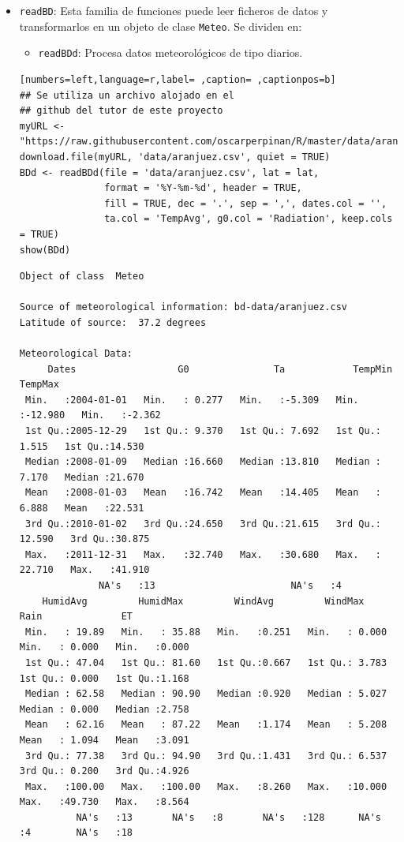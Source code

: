 \begin{itemize}
\item \texttt{readBD}: Esta familia de funciones puede leer ficheros de datos y transformarlos en un objeto de clase \texttt{Meteo}. Se dividen en:
\begin{itemize}
\item \texttt{readBDd}: Procesa datos meteorológicos de tipo diarios.
\end{itemize}
\begin{lstlisting}[numbers=left,language=r,label= ,caption= ,captionpos=b]
## Se utiliza un archivo alojado en el
## github del tutor de este proyecto 
myURL <-"https://raw.githubusercontent.com/oscarperpinan/R/master/data/aranjuez.csv"
download.file(myURL, 'data/aranjuez.csv', quiet = TRUE)
BDd <- readBDd(file = 'data/aranjuez.csv', lat = lat,
               format = '%Y-%m-%d', header = TRUE,
               fill = TRUE, dec = '.', sep = ',', dates.col = '',
               ta.col = 'TempAvg', g0.col = 'Radiation', keep.cols = TRUE)
show(BDd)
\end{lstlisting}

\begin{verbatim}
Object of class  Meteo 

Source of meteorological information: bd-data/aranjuez.csv 
Latitude of source:  37.2 degrees

Meteorological Data:
     Dates                  G0               Ta            TempMin           TempMax      
 Min.   :2004-01-01   Min.   : 0.277   Min.   :-5.309   Min.   :-12.980   Min.   :-2.362  
 1st Qu.:2005-12-29   1st Qu.: 9.370   1st Qu.: 7.692   1st Qu.:  1.515   1st Qu.:14.530  
 Median :2008-01-09   Median :16.660   Median :13.810   Median :  7.170   Median :21.670  
 Mean   :2008-01-03   Mean   :16.742   Mean   :14.405   Mean   :  6.888   Mean   :22.531  
 3rd Qu.:2010-01-02   3rd Qu.:24.650   3rd Qu.:21.615   3rd Qu.: 12.590   3rd Qu.:30.875  
 Max.   :2011-12-31   Max.   :32.740   Max.   :30.680   Max.   : 22.710   Max.   :41.910  
		      NA's   :13                        NA's   :4                         
    HumidAvg         HumidMax         WindAvg         WindMax            Rain              ET       
 Min.   : 19.89   Min.   : 35.88   Min.   :0.251   Min.   : 0.000   Min.   : 0.000   Min.   :0.000  
 1st Qu.: 47.04   1st Qu.: 81.60   1st Qu.:0.667   1st Qu.: 3.783   1st Qu.: 0.000   1st Qu.:1.168  
 Median : 62.58   Median : 90.90   Median :0.920   Median : 5.027   Median : 0.000   Median :2.758  
 Mean   : 62.16   Mean   : 87.22   Mean   :1.174   Mean   : 5.208   Mean   : 1.094   Mean   :3.091  
 3rd Qu.: 77.38   3rd Qu.: 94.90   3rd Qu.:1.431   3rd Qu.: 6.537   3rd Qu.: 0.200   3rd Qu.:4.926  
 Max.   :100.00   Max.   :100.00   Max.   :8.260   Max.   :10.000   Max.   :49.730   Max.   :8.564  
		  NA's   :13       NA's   :8       NA's   :128      NA's   :4        NA's   :18
\end{verbatim}


\end{itemize}
